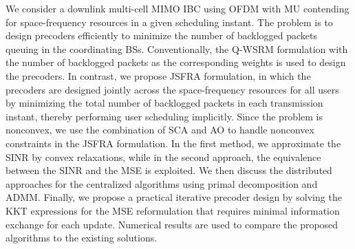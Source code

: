 We consider a downlink multi-cell \ac{MIMO} \ac{IBC} using \ac{OFDM} with \acl{MU} contending for space-frequency resources in a given scheduling instant. The problem is to design precoders efficiently to minimize the number of backlogged packets queuing in the coordinating \acp{BS}. Conventionally, the \ac{Q-WSRM} formulation with the number of backlogged packets as the corresponding weights is used to design the precoders. In contrast, we propose \ac{JSFRA} formulation, in which the precoders are designed jointly across the space-frequency resources for all users by minimizing the total number of backlogged packets in each transmission instant, thereby performing user scheduling implicitly. Since the problem is nonconvex, we use the combination of \ac{SCA} and \ac{AO} to handle nonconvex constraints in the \ac{JSFRA} formulation. In the first method, we approximate the \ac{SINR} by convex relaxations, while in the second approach, the equivalence between the \ac{SINR} and the \ac{MSE} is exploited. We then discuss the distributed approaches for the centralized algorithms using primal decomposition and \ac{ADMM}. Finally, we propose a practical iterative precoder design by solving the \acl{KKT} expressions for the \ac{MSE} reformulation that requires minimal information exchange for each update. Numerical results are used to compare the proposed algorithms to the existing solutions.
